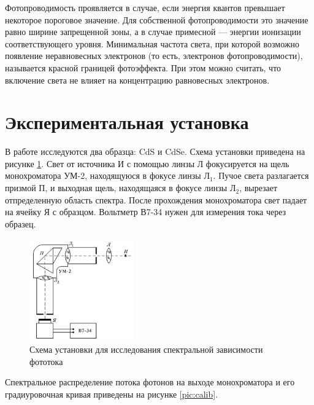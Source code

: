 \documentclass[12pt]{kiarticle} %
\begin{document}
	Фотопроводимость проявляется в случае, если энергия квантов превышает некоторое пороговое значение. Для собственной фотопроводимости это значение равно ширине запрещенной зоны, а в случае примесной --- энергии ионизации соответствующего уровня. Минимальная частота света, при которой возможно появление неравновесных электронов (то есть, электронов фотопроводимости), называется красной границей фотоэффекта. При этом можно считать, что включение света не влияет на концентрацию равновесных электронов. 
	

	\section{Экспериментальная установка}
	
	В работе исследуются два образца: CdS и CdSe. Схема установки приведена на рисунке \ref{pic:scheme}. Свет от источника И с помощью линзы Л фокусируется на щель монохроматора УМ-2, находящуюся в фокусе линзы Л$_1$. Пучое света разлагается призмой П, и выходная щель, находящаяся в фокусе линзы Л$_2$, вырезает отпределенную область спектра. После прохождения монохроматора свет падает на ячейку Я с образцом. Вольтметр В7-34 нужен для измерения тока через образец. 
	
	\begin{figure}[h]
		\centering	
		\includegraphics[width=0.4\textwidth]{lab.png}
		\caption{Схема установки для исследования спектральной зависимости фототока}
		\label{pic:scheme}
	\end{figure} 
	
	Спектральное распределение потока фотонов на выходе монохроматора и его градиуровочная кривая приведены на рисунке \ref{pic:calib}.
	
\end{document}
